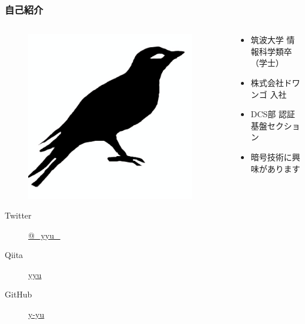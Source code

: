 \begin{frame}
  \frametitle{自己紹介}
  
  \begin{columns}
    \begin{column}{0.3\textwidth}
      \centering
      \begin{figure}
        \includegraphics[width=0.95\textwidth]{img/bird2x.png}
      \end{figure}

      \begin{description}
        \item[Twitter] \href{https://twitter.com/\_yyu\_}{@\_yyu\_}
        \item[Qiita] \href{http://qiita.com/yyu}{yyu}
        \item[GitHub] \href{https://github.com/y-yu}{y-yu}
      \end{description}
    \end{column}
    \begin{column}{0.7\textwidth}
      \begin{itemize}
        \item<2-> 筑波大学 情報科学類卒（学士）
        \item<3-> 株式会社ドワンゴ 入社
        \item<4-> DCS部 認証基盤セクション
        \item<5-> 暗号技術に興味があります
      \end{itemize}
    \end{column}
  \end{columns}
\end{frame}

